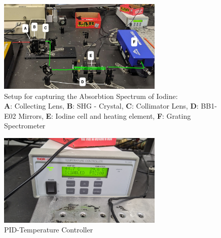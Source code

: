 \begin{figure}[H]
    \centering
    \captionsetup{margin=3cm}
    \includegraphics[width=0.7\textwidth]{graphics/iodine1.jpg}
    \caption{
        Setup for capturing the Absorbtion Spectrum of Iodine: \\
        \textbf{A}: Collecting Lens, 
        \textbf{B}: SHG - Crystal,
        \textbf{C}: Collimator Lens,
        \textbf{D}: BB1-E02 Mirrors,
        \textbf{E}: Iodine cell and heating element,
        \textbf{F}: Grating Spectrometer
    }
    \label{fig:setup:iodine}
\end{figure}

\begin{figure}[H]
    \centering
    \captionsetup{margin=3cm}
    \includegraphics[width=0.7\textwidth]{graphics/temperature-controller.jpg}
    \caption{PID-Temperature Controller}
    \label{fig:setup:temperature-controller}
\end{figure}
\newpage